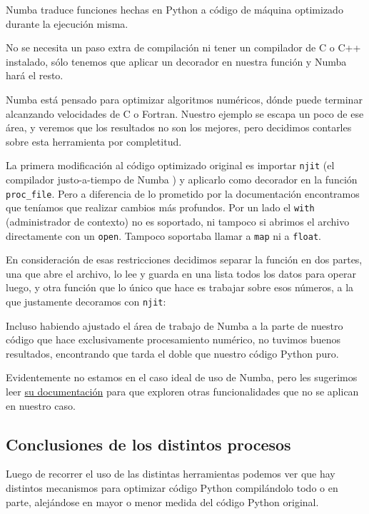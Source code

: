 Numba traduce funciones hechas en Python a código de máquina optimizado durante la ejecución misma.

No se necesita un paso extra de compilación ni tener un compilador de C o C++ instalado, sólo tenemos que aplicar un decorador en nuestra función y Numba hará el resto.

Numba está pensado para optimizar algoritmos numéricos, dónde puede terminar alcanzando velocidades de C o Fortran. Nuestro ejemplo se escapa un poco de ese área, y veremos que los resultados no son los mejores, pero decidimos contarles sobre esta herramienta por completitud.

La primera modificación al código optimizado original es importar \texttt{njit} (el compilador justo-a-tiempo de Numba ) y aplicarlo como decorador en la función \texttt{proc\_file}. Pero a diferencia de lo prometido por la documentación encontramos que teníamos que realizar cambios más profundos. Por un lado el \texttt{with} (administrador de contexto) no es soportado, ni tampoco si abrimos el archivo directamente con un \texttt{open}. Tampoco soportaba llamar a \texttt{map} ni a \texttt{float}.

En consideración de esas restricciones decidimos separar la función en dos partes, una que abre el archivo, lo lee y guarda en una lista todos los datos para operar luego, y otra función que lo único que hace es trabajar sobre esos números, a la que justamente decoramos con \texttt{njit}:


Incluso habiendo ajustado el área de trabajo de Numba a la parte de nuestro código que hace exclusivamente procesamiento numérico, no tuvimos buenos resultados, encontrando que tarda el doble que nuestro código Python puro.

Evidentemente no estamos en el caso ideal de uso de Numba, pero les sugerimos leer \href{https://numba.pydata.org/}{su documentación} para que exploren otras funcionalidades que no se aplican en nuestro caso.


\subsection{Conclusiones de los distintos procesos}

Luego de recorrer el uso de las distintas herramientas podemos ver que hay distintos mecanismos para optimizar código Python compilándolo todo o en parte, alejándose en mayor o menor medida del código Python original.

